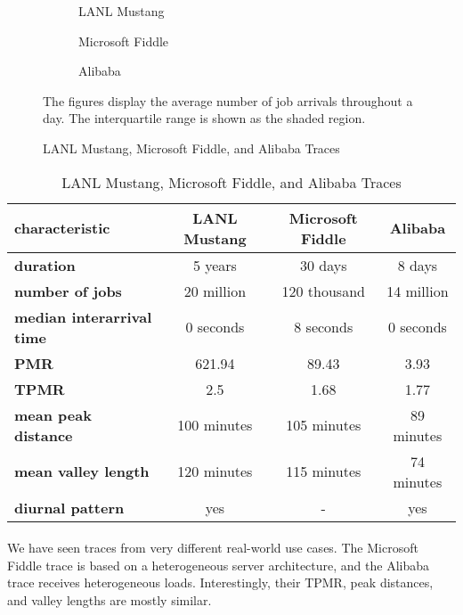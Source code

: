 \begin{figure}
    \begin{subfigure}[b]{.3\linewidth}
    \resizebox{\textwidth}{!}{}
    \caption{LANL Mustang}\label{fig:los_alamos:histogram}
    \end{subfigure}
    \begin{subfigure}[b]{.3\linewidth}
    \resizebox{\textwidth}{!}{}
    \caption{Microsoft Fiddle}\label{fig:microsoft:histogram}
    \end{subfigure}
    \begin{subfigure}[b]{.3\linewidth}
    \resizebox{\textwidth}{!}{}
    \caption{Alibaba}\label{fig:alibaba:histogram}
    \end{subfigure}

    The figures display the average number of job arrivals throughout a day. The interquartile range is shown as the shaded region.
    \caption{LANL Mustang, Microsoft Fiddle, and Alibaba Traces}
\end{figure}

\begin{table}[]
    \centering
    \begin{tabular}{>{\bfseries\centering}l|c|c|c}
        characteristic & LANL Mustang & Microsoft Fiddle & Alibaba \\\hline
        duration & 5 years & 30 days & 8 days \\
        number of jobs & 20 million & 120 thousand & 14 million \\
        median interarrival time & 0 seconds & 8 seconds & 0 seconds \\
        PMR & 621.94 & 89.43 & 3.93 \\
        TPMR & 2.5 & 1.68 & 1.77 \\
        mean peak distance & 100 minutes & 105 minutes & 89 minutes \\
        mean valley length & 120 minutes & 115 minutes & 74 minutes \\
        diurnal pattern & yes & - & yes \\
    \end{tabular}
    \caption{LANL Mustang, Microsoft Fiddle, and Alibaba Traces}
    \label{tab:traces}
\end{table}

\paragraph{} We have seen traces from very different real-world use cases. The Microsoft Fiddle trace is based on a heterogeneous server architecture, and the Alibaba trace receives heterogeneous loads. Interestingly, their TPMR, peak distances, and valley lengths are mostly similar.

